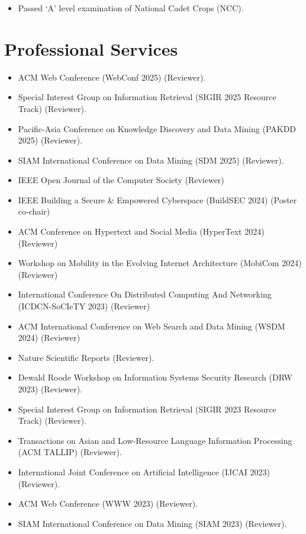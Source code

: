 \documentclass[margin, centered,lmodern]{res}
\begin{document}
\begin{resume}
\begin{itemize}[leftmargin=*]
 \item Passed `A' level examination of National Cadet Crops (NCC).
\end{itemize}

\section{Professional Services}
\begin{itemize}[leftmargin=*]
\item ACM Web Conference (WebConf 2025) (Reviewer).
\item Special Interest Group on Information Retrieval (SIGIR 2025 Resource Track) (Reviewer).
\item Pacific-Asia Conference on Knowledge Discovery and Data Mining (PAKDD 2025) (Reviewer).
\item SIAM International Conference on Data Mining (SDM 2025) (Reviewer).
\item IEEE Open Journal of the Computer Society (Reviewer)
\item IEEE Building a Secure & Empowered Cyberspace (BuildSEC 2024) (Poster co-chair)
\item ACM Conference on Hypertext and Social Media (HyperText 2024) (Reviewer)
\item Workshop on Mobility in the Evolving Internet Architecture (MobiCom 2024) (Reviewer)
\item International Conference On Distributed Computing And Networking (ICDCN-SoCIeTY 2023) (Reviewer)
\item ACM International Conference on Web Search and Data Mining (WSDM 2024) (Reviewer)
\item Nature Scientific Reports (Reviewer).
\item Dewald Roode Workshop on Information Systems Security Research (DRW 2023) (Reviewer).
\item Special Interest Group on Information Retrieval (SIGIR 2023 Resource Track) (Reviewer).
\item Transactions on Asian and Low-Resource Language Information Processing (ACM TALLIP) (Reviewer).
\item International Joint Conference on Artificial Intelligence (IJCAI 2023) (Reviewer).
\item ACM Web Conference (WWW 2023) (Reviewer).
\item SIAM International Conference on Data Mining (SIAM 2023) (Reviewer).

\end{itemize}
\end{resume}
\end{document}
